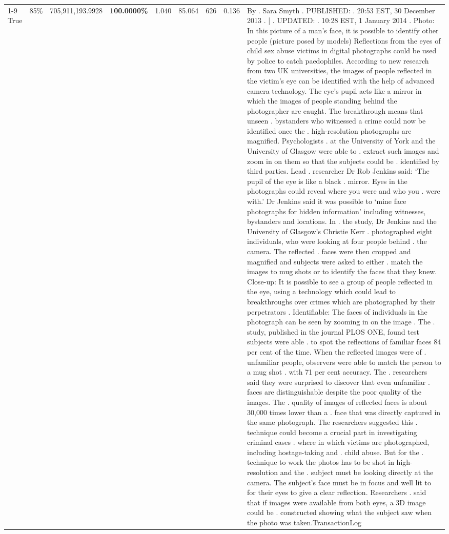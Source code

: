 \begin{table}[H]
\begin{tabular}{lllrlllll}
\cline{1-9} \cline{2-9}
True & 85\% & 705,911,193.9928 & \bfseries \color{red} 100.0000\% & 1.040 & 85.064 & 626 & 0.136 & By . Sara Smyth . PUBLISHED: . 20:53 EST, 30 December 2013 . | . UPDATED: . 10:28 EST, 1 January 2014 . Photo: In this picture of a man's face, it is possible to identify other people (picture posed by models) Reflections from the eyes of child sex abuse victims in digital photographs could be used by police to catch paedophiles. According to new research from two UK universities, the images of people reflected in the victim's eye can be identified with the help of advanced camera technology. The eye's pupil acts like a mirror in which the images of people standing behind the photographer are caught. The breakthrough means that unseen . bystanders who witnessed a crime could now be identified once the . high-resolution photographs are magnified. Psychologists . at the University of York and the University of Glasgow were able to . extract such images and zoom in on them so that the subjects could be . identified by third parties. Lead . researcher Dr Rob Jenkins said: ‘The pupil of the eye is like a black . mirror. Eyes in the photographs could reveal where you were and who you . were with.' Dr Jenkins said it was possible to ‘mine face photographs for hidden information' including witnesses, bystanders and locations. In . the study, Dr Jenkins and the University of Glasgow's Christie Kerr . photographed eight individuals, who were looking at four people behind . the camera. The reflected . faces were then cropped and magnified and subjects were asked to either . match the images to mug shots or to identify the faces that they knew. Close-up: It is possible to see a group of people reflected in the eye, using a technology which could lead to breakthroughs over crimes which are photographed by their perpetrators . Identifiable: The faces of individuals in the photograph can be seen by zooming in on the image . The . study, published in the journal PLOS ONE, found test subjects were able . to spot the reflections of familiar faces 84 per cent of the time. When the reflected images were of . unfamiliar people, observers were able to match the person to a mug shot . with 71 per cent accuracy. The . researchers said they were surprised to discover that even unfamiliar . faces are distinguishable despite the poor quality of the images. The . quality of images of reflected faces is about 30,000 times lower than a . face that was directly captured in the same photograph. The researchers suggested this . technique could become a crucial part in investigating criminal cases . where in which victims are photographed, including hostage-taking and . child abuse. But for the . technique to work the photos has to be shot in high-resolution and the . subject must be looking directly at the camera. The subject's face must be in focus and well lit to for their eyes to give a clear reflection. Researchers . said that if images were available from both eyes, a 3D image could be . constructed showing what the subject saw when the photo was taken.TransactionLog \\

\end{tabular}
\end{table}
